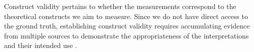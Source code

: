 Construct validity pertains to whether the measurements correspond to the theoretical constructs we aim to measure. Since we do not have direct access to the ground truth, establishing construct validity requires accumulating evidence from multiple sources to demonstrate the appropriateness of the interpretations and their intended use \citep{messick1989meaning}. 












